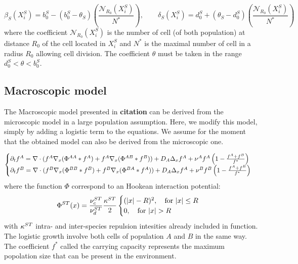 	
	\begin{equation}
\beta_{S}(X_i^S)=b_{0}^{S}-(b_{0}^{S}-\theta_{S})\left(\frac{\mathcal{N}_{R_0}(X_i^S)}{N^{*}}\right), \quad\quad \delta_{S}(X_i^S)=d_{0}^{S}+(\theta_{S}-d_{0}^{S})\left(\frac{\mathcal{N}_{R_0}(X_i^S)}{N^{*}}\right)
\end{equation}
	where the coefficient $\mathcal{N}_{R_0}(X_i^S)$ is the number of cell (of both population) at distance $R_0$ of the cell located in $X_i^S$ and $N^*$ is the maximal number of cell in a radius $R_0$ allowing cell division. The coefficient $\theta$ must be taken in the range $d_{0}^{S}<\theta<b_{0}^{S}$.


	\subsection{Macroscopic model}
	The Macroscopic model presented in \textbf{citation} can be derived from the microscopic model in a large population assumption. Here, we modify this model, simply by adding a logistic term to the equations. We assume for the moment that the obtained model can also be derived from the microscopic one.
	
	\begin{equation}
		\begin{cases}
	{\partial}_t f^{A}=  \nabla \cdot (f^A\nabla_x(\Phi^{AA}* f^A) + f^A \nabla_x( \Phi^{AB}*f^B)) + D_A \Delta_x f^A + \nu^{A}f^A\left( 1-\frac{f^A+f^B}{f^{*}} \right) \\
	
	{\partial}_t f^{B}=  \nabla \cdot (f^B\nabla_x(\Phi^{BB}* f^B) + f^B \nabla_x (\Phi^{BA}*f^A)) + D_A \Delta_x f^A + \nu^{B}f^B\left( 1-\frac{f^A+f^B}{f^{*}} \right)
		\end{cases}
	\end{equation}
	where the function $\Phi$ correspond to an Hookean interaction potential:
	\begin{equation}
	\Phi^{ST}(x)=\frac{\nucST}{\nudST}\frac{\KST}{2}
	 \begin{cases}
	  (|x|-R)^2, \quad \text{for } |x|\leq R\\
	  0, \quad \text{for } |x|> R
	 \end{cases}
	\end{equation}
	with  $\kappa^{ST}$ intra- and inter-species repulsion intesities already included in function.
	The logistic growth involve both cells of population $A$ and $B$ in the same way. The coefficient $f^*$ called the carrying capacity represents the maximum popolation size that can be present in the environment.
